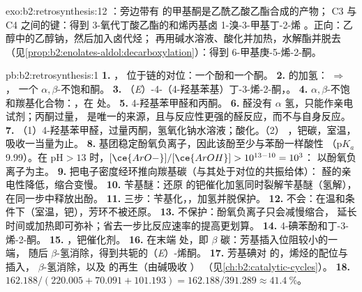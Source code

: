 \begin{solution}{exo:b2:retrosynthesis:12}
：旁边带有  的甲基酮是乙酰乙酸乙酯合成的产物；
 C3 与 C4 之间的键：得到 3-氧代丁酸乙酯的和烯丙基卤
1-溴-3-甲基丁-2-烯 。正向：乙醇中的乙醇钠，然后加入卤代烃；
再用碱水溶液、酸化并加热，水解酯并脱去 
（见\cref{prop:b2:enolates-aldol:decarboxylation}）：得到 6-甲基庚-5-烯-2-酮。
\end{solution}

\begin{solution}{pb:b2:retrosynthesis:1}
\textbf{1.} ， 位于链的对位：一个酚和一个酮。
\textbf{2.}  的加氢： $\Rightarrow$ ，
一个 $\alpha,\beta$-不饱和酮。
\textbf{3.} （\textit{E}）-4-（4-羟基苯基）丁-3-烯-2-酮，。
\textbf{4.} $\alpha,\beta$-不饱和羰基化合物：，在  处。
\textbf{5.} 4-羟基苯甲醛和丙酮。
\textbf{6.} 醛没有 $\alpha$ 氢，只能作亲电试剂；丙酮过量，
是唯一的来源，且与反应性更强的醛反应，而不与自身反应。
\textbf{7.} （1）4-羟基苯甲醛，过量丙酮，氢氧化钠水溶液；酸化。（2）
，钯碳，室温，吸收一当量为止。
\textbf{8.}  基团稳定酚氧负离子，因此该酚至少与苯酚一样酸性
（$\mathrm pK_a$ 9.99）。在 $\mathrm{pH} > 13$ 时，$[\ce{ArO-}]/[\ce{ArOH}] > 10^{13-10} = 10^3$：
以酚氧负离子为主。
\textbf{9.}  把电子密度经环推向羰基碳（与其处于对位的共振给体）：
醛的亲电性降低，缩合变慢。
\textbf{10.} 苄基醚：还原  的钯催化加氢同时裂解苄基醚（氢解），
在同一步中释放出酚。
\textbf{11.} 三步：苄基化，，加氢并脱保护。
\textbf{12.} 不会：在温和条件下（室温，钯），芳环不被还原。
\textbf{13.} 不保护：酚氧负离子只会减慢缩合，
延长时间或加热即可弥补；省去一步比反应速率的提高更划算。
\textbf{14.} 4-碘苯酚和丁-3-烯-2-酮。
\textbf{15.} ，钯催化剂。
\textbf{16.} 在末端  处，即 $\beta$ 碳：芳基插入位阻较小的一端，
随后 $\beta$-氢消除，得到共轭的（\textit{E}）-烯酮。
\textbf{17.} 芳基碘对  的，烯烃的配位与插入，
$\beta$-氢消除，以及  的再生（由碱吸收 ）
（见\cref{ch:b2:catalytic-cycles}）。
\textbf{18.} $162.188/(220.005 + 70.091 + 101.193) = 162.188/391.289 \approx 41.4~\%$。

\end{solution}
